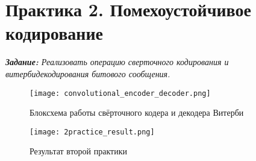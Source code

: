 \chapter*{Практика 2. Помехоустойчивое кодирование}
\label{ch:2_practice}
\label{sec:fig}
    

{ \itshape
    \textbf{Задание:}  Реализовать операцию сверточного кодирования и витербидекодирования битового сообщения.
}    
\begin{figure}[ht]
    \centering
    \texttt{[image: convolutional\_encoder\_decoder.png]}
    \caption{Блоксхема работы свёрточного кодера и декодера Витерби}
    \label{fig:symbolic_encoder_decoder.png}
\end{figure}

{
    \textbf{}

}
\begin{figure}[ht]
    \centering
    \texttt{[image: 2practice\_result.png]}
    \caption{Результат второй практики}
    \label{fig:2practice_result.png}
\end{figure}

\endinput